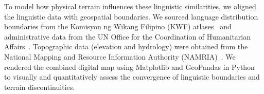 To model how physical terrain influences these linguistic similarities, we
aligned the linguistic data with geospatial boundaries. We sourced language
distribution boundaries from the Komisyon ng Wikang Filipino (KWF)
atlases~\cite{Marrion2025MapaKultural, KWF2025MapaPilipinas} and administrative
data from the UN Office for the Coordination of Humanitarian
Affairs~\cite{OCHA_Philippines_2018_PHL_Admin_Boundaries}. Topographic data
(elevation and hydrology) were obtained from the National Mapping and Resource
Information Authority (NAMRIA)~\cite{NAMRIA_Downloads}. We rendered the
combined digital map using Matplotlib and GeoPandas in
Python~\cite{Hunter:2007, kelsey_jordahl_2020_3946761} to visually and
quantitatively assess the convergence of linguistic boundaries and terrain
discontinuities.
